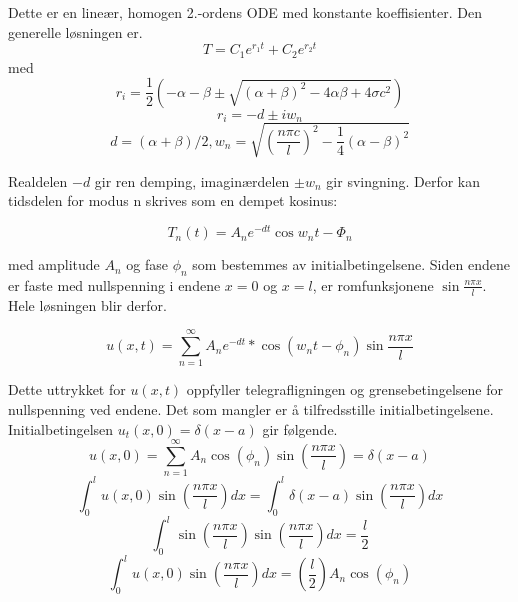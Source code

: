 Dette er en lineær, homogen 2.-ordens ODE med konstante koeffisienter. Den generelle løsningen er.
\begin{equation}
    T = C_1e^{r_1t}+C_2e^{r_2t}
\end{equation}
med
\begin{equation}
    r_i=\frac{1}{2}(-\alpha-\beta \pm \sqrt{(\alpha+\beta)^2 - 4\alpha\beta + 4\sigma c^2})
\end{equation}
\begin{equation}
    r_i=-d \pm iw_n
\end{equation}
\begin{equation}
    d=(\alpha+\beta)/2, w_n = \sqrt{\left( \frac{n\pi c}{l} \right)^2 - \frac{1}{4}(\alpha-\beta)^2}
\end{equation}

Realdelen $-d$ gir ren demping, imaginærdelen $\pm w_n$ gir svingning. Derfor kan tidsdelen for modus n skrives som en dempet kosinus:

\begin{equation}
    T_n(t) = A_n e^{-dt} \cos{w_nt-\Phi_n}
\end{equation}

med amplitude $A_n$ og fase $\phi_n$ som bestemmes av initialbetingelsene. Siden endene er faste med nullspenning i endene $x = 0$ og $x = l$, er romfunksjonene $\sin{\frac{n\pi x}{l}}$. Hele løsningen blir derfor.

\begin{equation}
    u(x,t)=\sum_{n=1}^{\infty}A_n e^{-d t} * \cos(w_nt-\phi_n) \sin{\frac{n \pi x}{l}}
\end{equation}

Dette uttrykket for $u(x,t)$ oppfyller telegrafligningen og grensebetingelsene for nullspenning ved endene. Det som mangler er å tilfredsstille initialbetingelsene. Initialbetingelsen $u_t(x,0)=\delta(x-a)$ gir følgende.
\begin{equation}
    u(x,0)=\sum_{n=1}^{\infty}A_n\cos{(\phi_n)\sin{\left( \frac{n \pi x}{l} \right)} = \delta(x-a)}
\end{equation}
\begin{equation}
    \int_{0}^{l} u(x,0) \sin{\left( \frac{n\pi x}{l} \right)} dx = \int_{0}^{l} \delta(x-a) \sin{\left( \frac{n\pi x}{l} \right)} dx
\end{equation}
\begin{equation}
    \int_{0}^{l} \sin{\left( \frac{n\pi x}{l} \right)} \sin{\left( \frac{n\pi x}{l} \right)} dx = \frac{l}{2}
\end{equation}
\begin{equation}
    \int_{0}^{l} u(x,0) \sin{\left( \frac{n\pi x}{l} \right)} dx = \left( \frac{l}{2} \right)  A_n \cos(\phi_n)
\end{equation}


